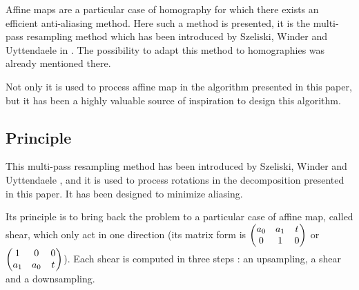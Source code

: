 

Affine maps are a particular case of homography for which there exists an efficient anti-aliasing method. Here such a method is presented, it is the multi-pass resampling method which has been introduced by Szeliski, Winder and Uyttendaele in \cite{szeliski2010high}. The possibility to adapt this method to homographies was already mentioned there. 

Not only it is used to process affine map in the algorithm presented in this paper, but it has been a highly valuable source of inspiration to design this algorithm.


\subsection{Principle}
	
	This multi-pass resampling method has been introduced by Szeliski, Winder and Uyttendaele \cite{szeliski2010high}, and it is used to process rotations in the decomposition presented in this paper. It has been designed to minimize aliasing.

	
	Its principle is to bring back the problem to a particular case of affine map, called shear, which only act in one direction (its matrix form is $\begin{pmatrix} a_0 & a_1 & t\\ 0 & 1 & 0 \end{pmatrix}$ or $\begin{pmatrix} 1 & 0 & 0\\ a_1 & a_0 & t \end{pmatrix}$). Each shear is computed in three steps : an upsampling, a shear and a downsampling.
	
